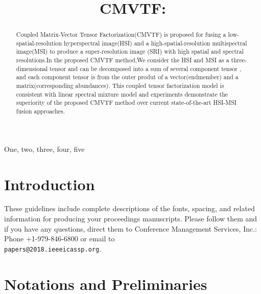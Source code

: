 \documentclass{article}
\title{CMVTF: }
\begin{document}
%
\maketitle
%
\begin{abstract}
Coupled Matrix-Vector Tensor Factorization(CMVTF)  is proposed for fusing a low-spatial-resolution hyperspectral image(HSI) and a high-spatial-resolution multispectral image(MSI) to produce a super-resolution image (SRI) with high spatial and spectral resolutions.In the proposed CMVTF method,We consider the HSI and MSI as a three-dimensional tensor and can be decomposed into a sum of several component tensor , and each component tensor is from the outer produt of a vector(endmember) and a matrix(corresponding abundances). This coupled tensor factorization model is consistent with linear spectral mixture model and experiments demonstrate the superiority of the proposed CMVTF method over current state-of-the-art HSI-MSI fusion approaches.
\end{abstract}
%
\begin{keywords}
One, two, three, four, five
\end{keywords}
%
\section{Introduction}
\label{sec:intro}

These guidelines include complete descriptions of the fonts, spacing, and
related information for producing your proceedings manuscripts. Please follow
them and if you have any questions, direct them to Conference Management
Services, Inc.: Phone +1-979-846-6800 or email
to \\\texttt{papers@2018.ieeeicassp.org}.

\section{Notations and Preliminaries}
\label{sec:pagestyle}
\end{document}
